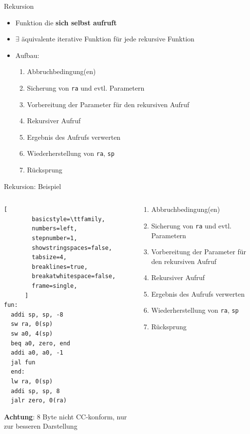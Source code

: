 \documentclass[
  german,            %
  aspectratio=169,    %
]{tumbeamer}
\begin{document}
\begin{frame}[c, fragile]{Rekursion}{}
  \begin{itemize}
    \item Funktion die \textbf{sich selbst aufruft}
    \item $\exists$ äquivalente iterative Funktion für jede rekursive Funktion
    \item Aufbau:
          \begin{enumerate}
            \item Abbruchbedingung(en)
            \item Sicherung von \verb|ra| und evtl. Parametern
            \item Vorbereitung der Parameter für den rekursiven Aufruf
            \item Rekursiver Aufruf
            \item Ergebnis des Aufrufs verwerten
            \item Wiederherstellung von \verb|ra|, \verb|sp|
            \item Rücksprung
          \end{enumerate}
  \end{itemize}
\end{frame}

\begin{frame}[c, fragile]{Rekursion: Beispiel}{}
  \begin{columns}[c]
    \begin{column}{0.4\textwidth}
      \begin{lstlisting}[
        basicstyle=\ttfamily,
        numbers=left,
        stepnumber=1,
        showstringspaces=false,
        tabsize=4,
        breaklines=true,
        breakatwhitespace=false,
        frame=single,
      ]
fun:
  addi sp, sp, -8
  sw ra, 0(sp)
  sw a0, 4(sp)
  beq a0, zero, end
  addi a0, a0, -1
  jal fun
  end:
  lw ra, 0(sp)
  addi sp, sp, 8
  jalr zero, 0(ra)
      \end{lstlisting}
      \small \textbf{Achtung}: 8 Byte nicht CC-konform, nur zur besseren Darstellung
    \end{column}
    \begin{column}{0.5\textwidth}
      \begin{enumerate}
        \item Abbruchbedingung(en)
        \item Sicherung von \verb|ra| und evtl. Parametern
        \item Vorbereitung der Parameter für den rekursiven Aufruf
        \item Rekursiver Aufruf
        \item Ergebnis des Aufrufs verwerten
        \item Wiederherstellung von \verb|ra|, \verb|sp|
        \item Rücksprung
      \end{enumerate}
      \vspace{1cm}
    \end{column}
  \end{columns}
\end{frame}
\end{document}
